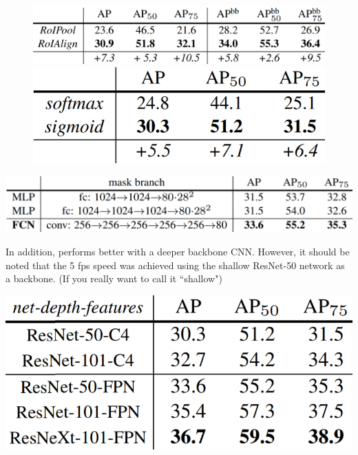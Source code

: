 \begin{figure}[htbp]
	\centering
	\begin{minipage}{0.55\textwidth}
		\centering
		\includegraphics[width=1\textwidth]{images/moreroialigncomparison.PNG} %
	\end{minipage}\hfill
	\begin{minipage}{0.35\textwidth}
		\centering
		\includegraphics[width=1\textwidth]{images/binarymaskcomparison.PNG} %
	\end{minipage}
\end{figure}

\begin{center}
	\includegraphics[scale=0.4]{images/fcncomparison.PNG}
\end{center}

In addition, \maskrcnn performs better with a deeper backbone CNN. However, it should be noted that the 5 fps speed was achieved using the shallow ResNet-50 network as a backbone. (If you really want to call it “shallow")

\begin{center}
	\includegraphics[scale=0.4]{images/backbonecomparison.PNG}
\end{center}

